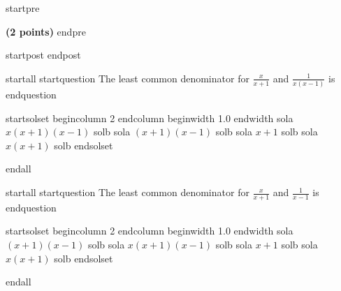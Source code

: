 
startpre \item {\bf (2 points)} endpre

startpost
endpost

startall
startquestion The least common denominator for $\displaystyle \frac{x}{x+1}$ and $\displaystyle \frac{1}{x(x-1)}$ is \vspace{.2cm}
endquestion 

startsolset
begincolumn 2 endcolumn
beginwidth 1.0 endwidth
sola $x(x+1)(x-1)$ solb
sola $(x+1)(x-1)$ solb
sola $x+1$ solb
sola $x(x+1)$ solb
endsolset

endall


startall
startquestion The least common denominator for $\displaystyle \frac{x}{x+1}$ and $\displaystyle \frac{1}{x-1}$ is \vspace{.2cm}
endquestion 

startsolset
begincolumn 2 endcolumn
beginwidth 1.0 endwidth
sola $(x+1)(x-1)$ solb
sola $x(x+1)(x-1)$ solb
sola $x+1$ solb
sola $x(x+1)$ solb
endsolset

endall
